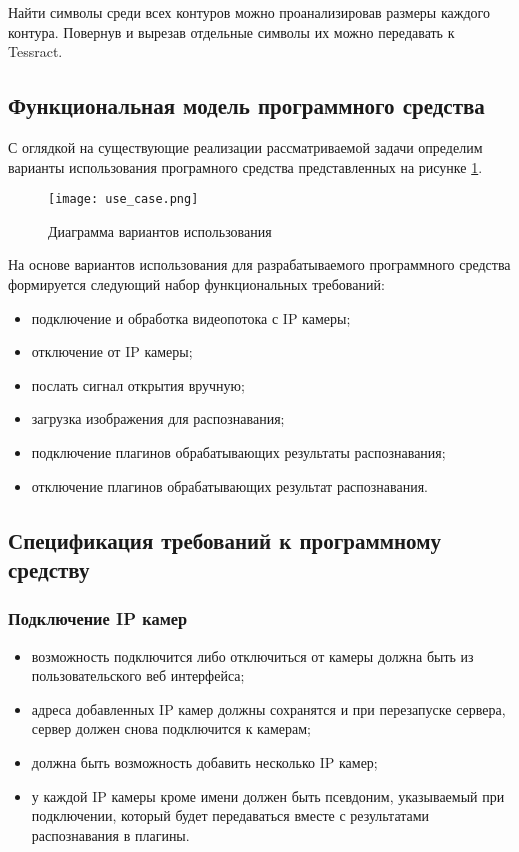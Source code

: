 Найти символы среди всех контуров можно проанализировав размеры каждого контура. Повернув и вырезав отдельные символы их можно передавать к Tessract. 

\subsection{Функциональная модель программного средства}
\label{sec:funcreq:funcmodel}

С оглядкой на существующие реализации рассматриваемой задачи определим варианты использования програмного средства представленных на рисунке \ref{fig:funcreq:funcmodel}.

\begin{figure}[p]
\centering
    \texttt{[image: use\_case.png]}  
    \caption{Диаграмма вариантов использования}
  \label{fig:funcreq:funcmodel}
\end{figure}

На основе вариантов использования для разрабатываемого программного средства формируется следующий набор функциональных требований:
\begin{itemize}
	\item подключение и обработка видеопотока с IP камеры;
  \item отключение от IP камеры;
	\item послать сигнал открытия вручную;
	\item загрузка изображения для распознавания;
	\item подключение плагинов обрабатывающих результаты распознавания;
	\item отключение плагинов обрабатывающих результат распознавания.
\end{itemize}

\subsection{Спецификация требований к программному средству}
\label{sec:fucreq:specification}

\subsubsection{Подключение IP камер}
\begin{itemize}
	\item возможность подключится либо отключиться от камеры должна быть из пользовательского веб интерфейса;
	\item адреса добавленных IP камер должны сохранятся и при перезапуске сервера, сервер должен снова подключится к камерам;
	\item должна быть возможность добавить несколько IP камер;
	\item у каждой IP камеры кроме имени должен быть псевдоним, указываемый при подключении, который будет передаваться вместе с результатами распознавания в плагины.
\end{itemize}


